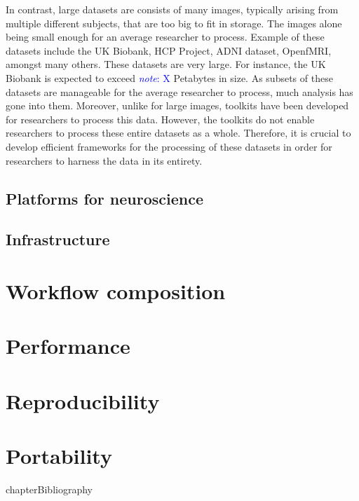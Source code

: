 \documentclass{report}
\newcommand{\note}[1]{\textcolor{blue}{\textit{note}: #1}}
\begin{document}
    In contrast, large datasets are consists of many images, typically arising
    from multiple different subjects, that are too big to fit in storage. 
    The images alone being small enough for an average researcher to process. 
    Example of these datasets include the UK Biobank, HCP Project, ADNI dataset,
    OpenfMRI, amongst many others. These datasets are very large. For instance, 
    the UK Biobank is expected to exceed \note{X} Petabytes in size. As subsets
    of these datasets are manageable for the average researcher to process, 
    much analysis has gone into them. Moreover, unlike for large images, 
    toolkits have been developed for researchers to process this data. However,
    the toolkits do not enable researchers to process these entire datasets as
    a whole. Therefore, it is crucial to develop efficient frameworks for the 
    processing of these datasets in order for researchers to harness the data
    in its entirety.

        \section{Platforms for  neuroscience}
        \section{Infrastructure}


    \chapter{Workflow composition}
    \chapter{Performance}
    \chapter{Reproducibility}
    \chapter{Portability}
        {chapter}{Bibliography} 
        
        
\end{document}
